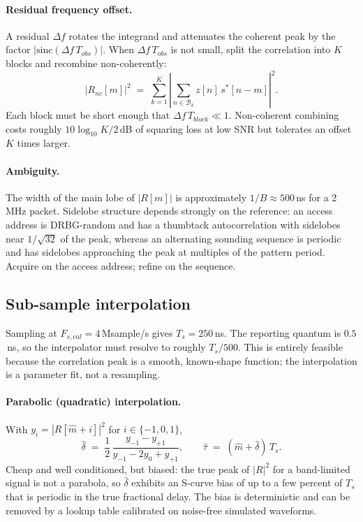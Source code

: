 \documentclass[11pt,a4paper]{article}
\begin{document}
\paragraph{Residual frequency offset.} A residual $\Delta f$ rotates the integrand and attenuates
the coherent peak by the factor $|\mathrm{sinc}(\Delta f\,T_{obs})|$. When
$\Delta f\, T_{obs}$ is not small, split the correlation into $K$ blocks and recombine
non-coherently:
\begin{equation}
\bigl|R_{nc}[m]\bigr|^2 \;=\; \sum_{k=1}^{K} \left| \sum_{n \in \mathcal{B}_k} z[n]\,s^{*}[n-m] \right|^2 .
\label{eq:noncoh}
\end{equation}
Each block must be short enough that $\Delta f\,T_{block} \ll 1$. Non-coherent combining costs
roughly $10\log_{10}K/2$\,dB of squaring loss at low SNR but tolerates an offset $K$ times larger.

\paragraph{Ambiguity.} The width of the main lobe of $|R[m]|$ is approximately $1/B \approx 500$\,ns
for a 2\,MHz packet. Sidelobe structure depends strongly on the reference: an access address is
DRBG-random and has a thumbtack autocorrelation with sidelobes near $1/\sqrt{32}$ of the peak,
whereas an alternating sounding sequence is periodic and has sidelobes approaching the peak at
multiples of the pattern period. Acquire on the access address; refine on the sequence.

\subsection{Sub-sample interpolation}
\label{sec:interp}

Sampling at $F_{s,cal}=4$\,Msample/s gives $T_s = 250$\,ns. The reporting quantum is $0.5$\,ns, so
the interpolator must resolve to roughly $T_s/500$. This is entirely feasible because the
correlation peak is a smooth, known-shape function; the interpolation is a parameter fit, not a
resampling.

\paragraph{Parabolic (quadratic) interpolation.} With $y_i = |R[\hat m + i]|^2$ for $i\in\{-1,0,1\}$,
\begin{equation}
\hat\delta \;=\; \frac{1}{2}\,\frac{y_{-1} - y_{+1}}{y_{-1} - 2y_{0} + y_{+1}},
\qquad
\hat\tau \;=\; (\hat m + \hat\delta)\,T_s .
\label{eq:parab}
\end{equation}
Cheap and well conditioned, but biased: the true peak of $|R|^2$ for a band-limited signal is not a
parabola, so $\hat\delta$ exhibits an S-curve bias of up to a few percent of $T_s$ that is periodic
in the true fractional delay. The bias is deterministic and can be removed by a lookup table
calibrated on noise-free simulated waveforms.
\end{document}
